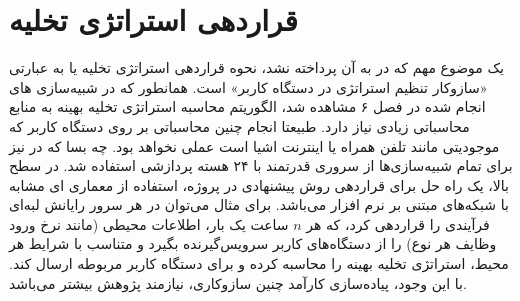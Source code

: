 \section{قراردهی استراتژی تخلیه}
یک موضوع مهم که در \CurrentProject به آن پرداخته نشد، نحوه قراردهی استراتژی تخلیه یا به عبارتی «سازوکار تنظیم استراتژی در دستگاه کاربر» است. همانطور که در شبیه‌سازی های انجام شده در فصل ۶ مشاهده شد، الگوریتم محاسبه استراتژی تخلیه بهینه به منابع محاسباتی زیادی نیاز دارد. طبیعتا انجام چنین محاسباتی بر روی دستگاه کاربر که موجودیتی مانند تلفن همراه یا اینترنت اشیا است عملی نخواهد بود. چه بسا که در \CurrentProject نیز برای تمام شبیه‌سازی‌ها از سروری قدرتمند با ۲۴ هسته پردازشی استفاده شد. در سطح بالا، یک راه حل برای قراردهی روش پیشنهادی در پروژه، استفاده از معماری ای مشابه با شبکه‌های مبتنی بر نرم افزار می‌باشد. برای مثال می‌توان در هر سرور رایانش لبه‌ای فرآیندی را قراردهی کرد، که هر $n$ ساعت یک بار، اطلاعات محیطی (مانند نرخ ورود وظایف هر نوع) را از دستگاه‌های کاربر سرویس‌گیرنده بگیرد و متناسب با شرایط هر محیط، استراتژی تخلیه بهینه را محاسبه کرده و برای دستگاه کاربر مربوطه ارسال کند. با این وجود، پیاده‌سازی کارآمد چنین سازوکاری، نیازمند پژوهش بیشتر می‌باشد.
\clearpage